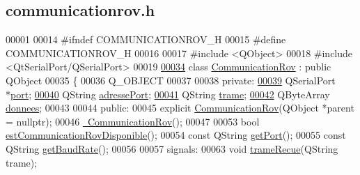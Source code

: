 \hypertarget{communicationrov_8h_source}{}\subsection{communicationrov.\+h}

\begin{DoxyCode}
00001 
00014 \textcolor{preprocessor}{#ifndef COMMUNICATIONROV\_H}
00015 \textcolor{preprocessor}{#define COMMUNICATIONROV\_H}
00016 
00017 \textcolor{preprocessor}{#include <QObject>}
00018 \textcolor{preprocessor}{#include <QtSerialPort/QSerialPort>}
00019 
\hyperlink{class_communication_rov}{00034} \textcolor{keyword}{class }\hyperlink{class_communication_rov}{CommunicationRov} : \textcolor{keyword}{public} QObject
00035 \{
00036     Q\_OBJECT
00037 
00038     \textcolor{keyword}{private}:
\hyperlink{class_communication_rov_a21b62067ef0b2a6aec339df60b4abd72}{00039}         QSerialPort *\hyperlink{class_communication_rov_a21b62067ef0b2a6aec339df60b4abd72}{port};   
\hyperlink{class_communication_rov_a7bd5d36d065005b27ed6cb421c7ffe42}{00040}         QString \hyperlink{class_communication_rov_a7bd5d36d065005b27ed6cb421c7ffe42}{adressePort}; 
\hyperlink{class_communication_rov_a7100b1be33860d235b45efd9010ac218}{00041}         QString \hyperlink{class_communication_rov_a7100b1be33860d235b45efd9010ac218}{trame};       
\hyperlink{class_communication_rov_acbb6939bb597179956c6f4bc5ca39f3f}{00042}         QByteArray \hyperlink{class_communication_rov_acbb6939bb597179956c6f4bc5ca39f3f}{donnees};  
00043 
00044     \textcolor{keyword}{public}:
00045         \textcolor{keyword}{explicit} \hyperlink{class_communication_rov_a22b64c69228d392a212f543e071adc02}{CommunicationRov}(QObject *parent = \textcolor{keyword}{nullptr});
00046         \hyperlink{class_communication_rov_a97e96f47dad6d47cbec4adc82756b49e}{~CommunicationRov}();
00047 
00053         \textcolor{keywordtype}{bool} \hyperlink{class_communication_rov_a513c26b04745fa2ae31b4533d656dfd4}{estCommunicationRovDisponible}();
00054         \textcolor{keyword}{const} QString \hyperlink{class_communication_rov_a6226f9338fffc648cfca91c8e585a26b}{getPort}(); 
00055         \textcolor{keyword}{const} QString \hyperlink{class_communication_rov_a810de691dfc6d305f77c92ccd90bb6db}{getBaudRate}(); 
00056 
00057     signals:
00063         \textcolor{keywordtype}{void} \hyperlink{class_communication_rov_add205822378629204a4ee49ca74c6d56}{trameRecue}(QString trame);

\end{DoxyCode}
